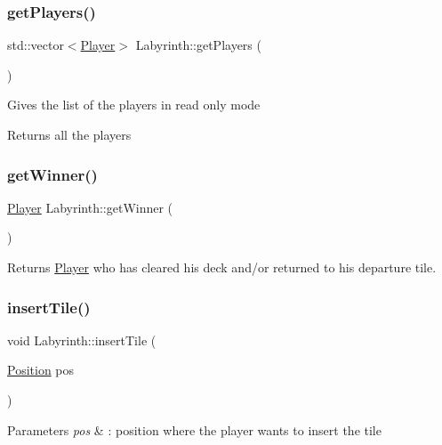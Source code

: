 \subsubsection{\texorpdfstring{getPlayers()}{getPlayers()}}
{\footnotesize\ttfamily std\+::vector$<$\mbox{\hyperlink{classPlayer}{Player}}$>$ Labyrinth\+::get\+Players (\begin{DoxyParamCaption}{ }\end{DoxyParamCaption})\hspace{0.3cm}{\ttfamily [inline]}}

Gives the list of the players in read only mode

\begin{DoxyReturn}{Returns}
all the players 
\end{DoxyReturn}
\mbox{\label{classLabyrinth_a5180cf4972163afe609de1e1df4ae49f}} 
\subsubsection{\texorpdfstring{getWinner()}{getWinner()}}
{\footnotesize\ttfamily \mbox{\hyperlink{classPlayer}{Player}} Labyrinth\+::get\+Winner (\begin{DoxyParamCaption}{ }\end{DoxyParamCaption})}

\begin{DoxyReturn}{Returns}
\mbox{\hyperlink{classPlayer}{Player}} who has cleared his deck and/or returned to his departure tile. 
\end{DoxyReturn}
\mbox{\label{classLabyrinth_af81c73f5853fee97d015889d30475ffe}} 
\subsubsection{\texorpdfstring{insertTile()}{insertTile()}}
{\footnotesize\ttfamily void Labyrinth\+::insert\+Tile (\begin{DoxyParamCaption}\item[{\mbox{\hyperlink{structPosition}{Position}}}]{pos }\end{DoxyParamCaption})}


\begin{DoxyParams}{Parameters}
{\em pos} & \+: position where the player wants to insert the tile \\
\hline
\end{DoxyParams}
\mbox{\label{classLabyrinth_a7685687fa2cd4fe73aa5d5643ac5d78b}} 
